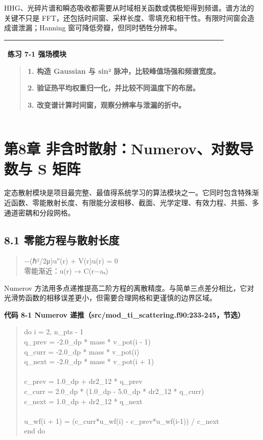 \documentclass[UTF8,openany,11pt,fontset=fandol]{ctexbook}
\begin{document}
HHG、光碎片谱和瞬态吸收都需要从时域相关函数或偶极矩得到频谱。谱方法的关键不只是
FFT，还包括时间窗、采样长度、零填充和相干性。有限时间窗会造成谱泄漏；Hanning
窗可降低旁瓣，但同时牺牲分辨率。

\begin{longtable}[]{@{}l@{}}
\toprule
\endhead
\begin{minipage}[t]{0.97\columnwidth}\raggedright
\textbf{练习 7-1 强场模块}

\begin{quote}
1. 构造 Gaussian 与 sin² 脉冲，比较峰值场强和频谱宽度。

2. 验证热平均权重归一化，并比较不同温度下的布居。

3. 改变谱计算时间窗，观察分辨率与泄漏的折中。
\end{quote}\strut
\end{minipage}\tabularnewline
\bottomrule
\end{longtable}

\chapter{第8章 非含时散射：Numerov、对数导数与 S 矩阵}\label{ux7b2c8ux7ae0-ux975eux542bux65f6ux6563ux5c04numerovux5bf9ux6570ux5bfcux6570ux4e0e-s-ux77e9ux9635}

定态散射模块是项目最完整、最值得系统学习的算法模块之一。它同时包含特殊渐近函数、零能散射长度、有限能分波相移、截面、光学定理、有效力程、共振、多通道密耦和分段网格。

\section{\texorpdfstring{\textbf{8.1
零能方程与散射长度}}{8.1 零能方程与散射长度}}\label{ux96f6ux80fdux65b9ux7a0bux4e0eux6563ux5c04ux957fux5ea6}

\begin{quote}
−(ℏ²/2μ)u″(r) + V(r)u(r) = 0\\
零能渐近：u(r) → C(r−aₛ)
\end{quote}

Numerov
方法用多点递推提高二阶方程的离散精度。与简单三点差分相比，它对光滑势函数的相移误差更小，但需要合理网格和更谨慎的边界区域。

\textbf{代码 8-1 Numerov
递推（src/mod\_ti\_scattering.f90:233-245，节选）}

\begin{quote}
do i = 2, n\_pts - 1\\
q\_prev = -2.0\_dp * mass * v\_pot(i - 1)\\
q\_curr = -2.0\_dp * mass * v\_pot(i)\\
q\_next = -2.0\_dp * mass * v\_pot(i + 1)\\
~\\
c\_prev = 1.0\_dp + dr2\_12 * q\_prev\\
c\_curr = 2.0\_dp * (1.0\_dp - 5.0\_dp * dr2\_12 * q\_curr)\\
c\_next = 1.0\_dp + dr2\_12 * q\_next\\
~\\
u\_wf(i + 1) = (c\_curr*u\_wf(i) - c\_prev*u\_wf(i-1)) / c\_next\\
end do
\end{quote}
\end{document}
